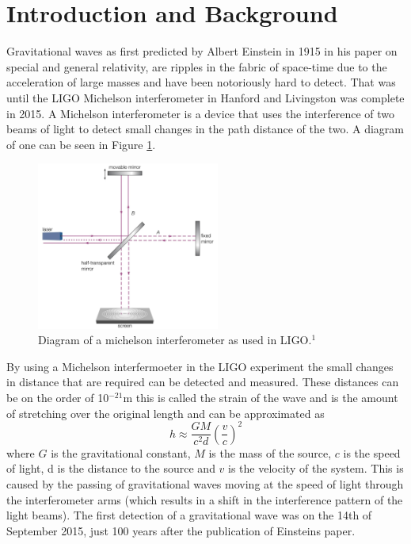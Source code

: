 \documentclass[]{article}
\begin{document}
\section*{Introduction and Background}
Gravitational waves as first predicted by Albert Einstein in 1915 in his paper on
special and general relativity, are ripples in the fabric of space-time due to the acceleration of large masses
and have been notoriously hard to detect. That was until
the LIGO Michelson interferometer in Hanford and Livingston was complete in 2015.
A Michelson interferometer is a device that uses the interference of two beams of
light to detect small changes in the path distance of the two. A diagram of one can
be seen in Figure \ref{fig:michelson}.
\begin{figure}[h]
    \includegraphics[width=6cm]{images/michelson_interferometer.png}
    \caption{Diagram of a michelson interferometer as used in LIGO.$^1$}
    \label{fig:michelson}
\end{figure}
\newline
By using a Michelson interfermoeter in the LIGO experiment the small changes in
distance that are required can be detected and measured. These distances can be on the
order of 10$^{-21}$m this is called the strain of the wave and
is the amount of stretching over the original length and can be approximated as
\begin{equation}h \approx \frac{GM}{c^2d}\left(\frac{v}{c}\right)^2 \label{eq:strain}\end{equation}
where $G$ is the gravitational constant, $M$ is the mass of the source, $c$ is the speed of light,
d is the distance to the source and $v$ is the velocity of the system.
\newline
This is caused by the passing of gravitational waves moving at the speed of light
through the
interferometer arms (which results in a shift in the interference pattern of the light beams).
The first detection of a gravitational wave was on the 14th of
September 2015, just 100 years after the publication of Einsteins paper.
\end{document}
